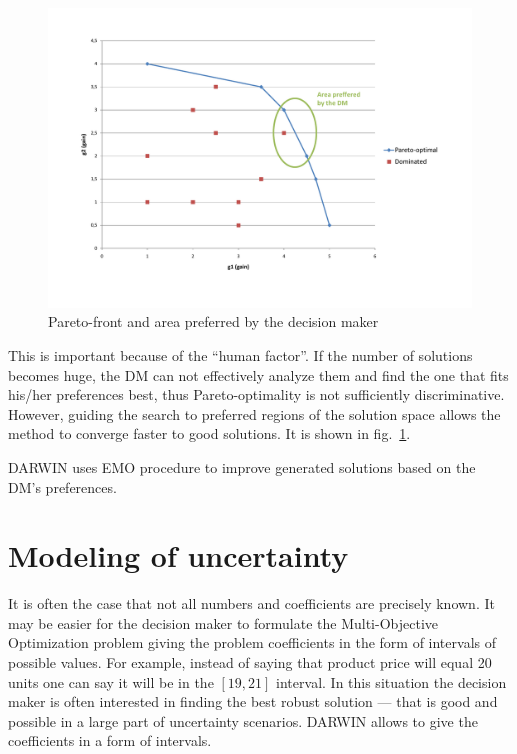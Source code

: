 \begin{figure}
  \centering \includegraphics[width=1.2\textwidth]{img/pareto}
  \caption{Pareto-front and area preferred by the decision maker}
  \label{pareto}
\end{figure}

This is important because of the ``human factor''. If the number of solutions
becomes huge, the DM can not effectively analyze them and find the one that
fits his/her preferences best, thus Pareto-optimality is not sufficiently
discriminative. However, guiding the search to preferred regions of the
solution space allows the method to converge faster to good solutions. It is
shown in fig.~\ref{pareto}.

DARWIN uses EMO procedure to improve generated solutions based on the DM's
preferences.


\section{Modeling of uncertainty}

It is often the case that not all numbers and coefficients are precisely
known. It may be easier for the decision maker to formulate the
Multi-Objective Optimization problem giving the problem coefficients in the
form of intervals of possible values. For example, instead of saying that
product price will equal 20 units one can say it will be in the $[19, 21]$
interval. In this situation the decision maker is often interested in finding
the best robust solution --- that is good and possible in a large part of
uncertainty scenarios. DARWIN allows to give the coefficients in a form of
intervals.

